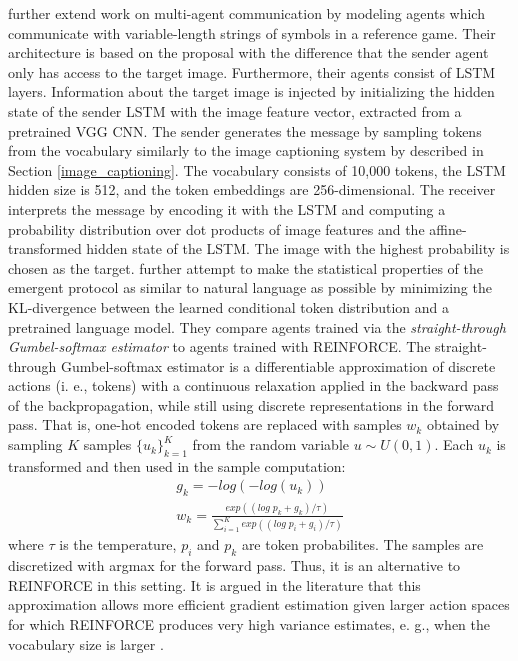 \cite{havrylov2017emergence} further extend work on multi-agent communication by modeling agents which  communicate with variable-length strings of symbols in a reference game. 
Their architecture is based on the proposal \cite{lazaridou2016multi} with the difference that the sender agent only has access to the target image. Furthermore, their agents consist of LSTM layers. Information about the target image is injected by initializing the hidden state of the sender LSTM with the image feature vector, extracted from a pretrained VGG CNN. The sender generates the message by sampling tokens from the vocabulary similarly to the image captioning system by \cite{vinyals2015show} described in Section \ref{image_captioning}. The vocabulary consists of 10,000 tokens, the LSTM hidden size is 512, and the token embeddings are 256-dimensional. 
The receiver interprets the message by encoding it with the LSTM and computing a probability distribution over dot products of image features and the affine-transformed hidden state of the LSTM. The image with the highest probability is chosen as the target. \cite{havrylov2017emergence} further attempt to make the statistical properties of the emergent protocol as similar to natural language as possible by minimizing the KL-divergence between the learned conditional token distribution and a pretrained language model.
They compare agents trained via the \textit{straight-through Gumbel-softmax estimator} to agents trained with REINFORCE. The straight-through Gumbel-softmax estimator is a differentiable approximation of discrete actions (i. e., tokens) with a continuous relaxation applied in the backward pass of the backpropagation, while still using discrete representations in the forward pass. 
That is, one-hot encoded tokens are replaced with samples $w_k$ obtained by sampling $K$ samples  $\{u_k\}_{k=1}^K$ from the random variable $u \sim U(0,1)$. Each $u_k$ is transformed and then used in the sample computation:
\begin{equation}
\begin{aligned}
g_k = -log(-log(u_k)) \\
w_k = \frac{exp((log \; p_k + g_k) / \tau)}{\sum_{i=1}^{K} exp((log \; p_i + g_i) / \tau)}
\end{aligned}
\end{equation}
where $\tau$ is the temperature, $p_i$ and $p_k$ are token probabilites. The samples are discretized with argmax for the forward pass. Thus, it is an alternative to REINFORCE in this setting.
It is argued in the literature that this approximation allows more efficient gradient estimation given larger action spaces for which REINFORCE produces very high variance estimates, e. g., when the vocabulary size is larger \parencite{havrylov2017emergence}.

